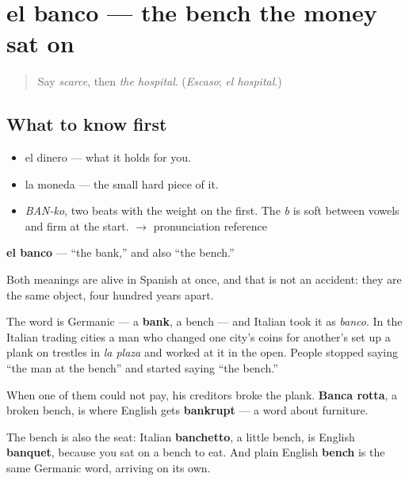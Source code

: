 \section[el banco]{el banco — the bench the money sat on}

\label{lesson:ES-C353-banco}



\begin{quote}
Say \emph{scarce}, then \emph{the hospital}. (\emph{Escaso}; \emph{el hospital}.)
\end{quote}

\subsection*{What to know first}
\begin{itemize}
\raggedright
  \item el dinero — what it holds for you.
  \item la moneda — the small hard piece of it.
\end{itemize}

\begin{sounds}
\begin{itemize}
\raggedright
  \item \emph{BAN-ko}, two beats with the weight on the first. The \emph{b} is soft between vowels and firm at the start. $\to$ pronunciation reference
\end{itemize}
\end{sounds}

\begin{cousinweb}
\textbf{el banco} — \textquotedblleft{}the bank,\textquotedblright{} and also \textquotedblleft{}the bench.\textquotedblright{}

Both meanings are alive in Spanish at once, and that is not an accident: they are the same object, four hundred years apart.

The word is Germanic — a \textbf{bank}, a bench — and Italian took it as \emph{banco}. In the Italian trading cities a man who changed one city's coins for another's set up a plank on trestles in \emph{la plaza} and worked at it in the open. People stopped saying \textquotedblleft{}the man at the bench\textquotedblright{} and started saying \textquotedblleft{}the bench.\textquotedblright{}

When one of them could not pay, his creditors broke the plank. \textbf{Banca rotta}, a broken bench, is where English gets \textbf{bankrupt} — a word about furniture.

The bench is also the seat: Italian \textbf{banchetto}, a little bench, is English \textbf{banquet}, because you sat on a bench to eat. And plain English \textbf{bench} is the same Germanic word, arriving on its own.
\end{cousinweb}

